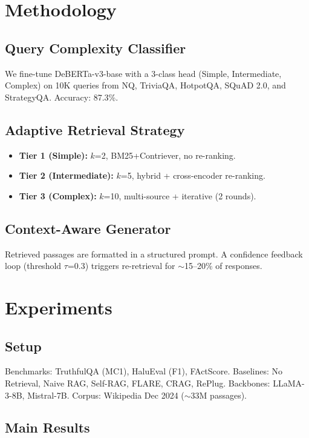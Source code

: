 \documentclass[11pt]{article}
\begin{document}
\section{Methodology}

\subsection{Query Complexity Classifier}
We fine-tune DeBERTa-v3-base with a 3-class head (Simple, Intermediate, Complex) on 10K queries from NQ, TriviaQA, HotpotQA, SQuAD 2.0, and StrategyQA. Accuracy: 87.3\%.

\subsection{Adaptive Retrieval Strategy}
\begin{itemize}
    \item \textbf{Tier 1 (Simple):} $k$=2, BM25+Contriever, no re-ranking.
    \item \textbf{Tier 2 (Intermediate):} $k$=5, hybrid + cross-encoder re-ranking.
    \item \textbf{Tier 3 (Complex):} $k$=10, multi-source + iterative (2 rounds).
\end{itemize}

\subsection{Context-Aware Generator}
Retrieved passages are formatted in a structured prompt. A confidence feedback loop (threshold $\tau$=0.3) triggers re-retrieval for $\sim$15--20\% of responses.

\section{Experiments}

\subsection{Setup}
Benchmarks: TruthfulQA (MC1), HaluEval (F1), FActScore. Baselines: No Retrieval, Naive RAG, Self-RAG, FLARE, CRAG, RePlug. Backbones: LLaMA-3-8B, Mistral-7B. Corpus: Wikipedia Dec 2024 ($\sim$33M passages).

\subsection{Main Results}
\end{document}

